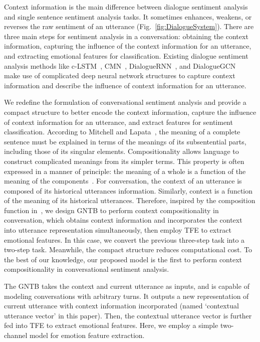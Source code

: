 \documentclass[journal]{IEEEtran}
\begin{document}
Context information is the main difference between dialogue sentiment analysis and single sentence sentiment analysis tasks. It sometimes enhances, weakens, or reverses the raw sentiment of an utterance (Fig.~\ref{fig:DialogueSystem}). There are three main steps for sentiment analysis in a conversation: obtaining the context information, capturing the influence of the context information for an utterance, and extracting emotional features for classification. Existing dialogue sentiment analysis methods like c-LSTM~\cite{poria2017context}, CMN~\cite{hazarika2018conversational}, DialogueRNN~\cite{majumder2019dialoguernn}, and DialogueGCN~\cite{ghosal2019dialoguegcn} make use of complicated deep neural network structures to capture context information and describe the influence of context information for an utterance.

We redefine the formulation of conversational sentiment analysis and provide a compact structure to better encode the context information, capture the influence of context information for an utterance, and extract features for sentiment classification. According to Mitchell and Lapata~\cite{mitchell2010composition}, the meaning of a complete sentence must be explained in terms of the meanings of its subsentential parts, including those of its singular elements. Compositionality allows language to construct complicated meanings from its simpler terms. This property is often expressed in a manner of principle: the meaning of a whole is a function of the meaning of the components~\cite{partee1995lexical}. For conversation, the context of an utterance is composed of its historical utterances information. Similarly, context is a function of the meaning of its historical utterances. Therefore, inspired by the composition function in~\cite{partee1995lexical}, we design GNTB to perform context compositionality in conversation, which obtains context information and incorporates the context into utterance representation simultaneously, then employ TFE to extract emotional features. In this case, we convert the previous three-step task into a two-step task. Meanwhile, the compact structure reduces computational cost. To the best of our knowledge, our proposed model is the first to perform context compositionality in conversational sentiment analysis.

The GNTB takes the context and current utterance as inputs, and is capable of modeling conversations with arbitrary turns. It outputs a new representation of current utterance with context information incorporated (named `contextual utterance vector' in this paper). Then, the contextual utterance vector is further fed into TFE to extract emotional features. Here, we employ a simple two-channel model for emotion feature extraction.
\end{document}
